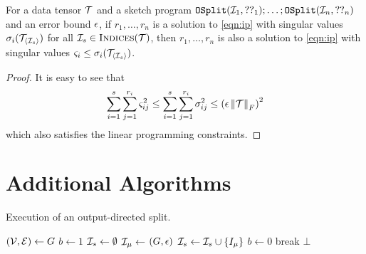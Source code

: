\begin{theorem}\label{thm:appendix:cost-bound}
For a data tensor $\mathcal{T}$ and a sketch program $\mathtt{OSplit}(\mathcal{I}_1, ??_1); \ldots; \mathtt{OSplit}(\mathcal{I}_n, ??_n)$ and an error bound $\epsilon$, if $r_1, \ldots, r_n$ is a solution to \cref{eqn:ip} with singular values $\sigma_i(\mathcal{T}_{\langle\mathcal{I}_s\rangle})$ for all $\mathcal{I}_s \in \textsc{Indices}(\mathcal{T})$, then $r_1, \ldots, r_n$ is also a solution to \cref{eqn:ip} with singular values $\varsigma_i \leq \sigma_i(\mathcal{T}_{\langle\mathcal{I}_s\rangle})$.
\end{theorem}
\begin{proof}
It is easy to see that
$$
\sum_{i=1}^{s}\sum_{j=1}^{r_i} \varsigma_{ij}^{2} \leq \sum_{i=1}^{s}\sum_{j=1}^{r_i} \sigma_{ij}^2 \leq \left(\epsilon\left\lVert\mathcal{T}\right\rVert_{F}\right)^2
$$
which also satisfies the linear programming constraints.
\end{proof}

\section{Additional Algorithms}\label{sec:appendix:alg}
\begin{algorithm}[h]
\small
\caption{Execution of an output-directed split.}\label{alg:out-split}
\begin{algorithmic}[1]
        \State $(\mathcal{V}, \mathcal{E}) \gets G$
            \State $b \gets 1$
            \State $\mathcal{I}_s \gets \emptyset$
                \State $\mathcal{I}_\mu \gets$ 
                \If{$\ind_\mu = \ind$}
                    \State \Return $(G, \epsilon)$
                \ElsIf{$\ind_\mu \subset \ind$}
                    \State $\mathcal{I}_s \gets \mathcal{I}_s \cup \{I_\mu\}$
                \ElsIf{$\ind_\mu \cap \ind \not= \emptyset$}
                    \State $b \gets 0$
                    \State break
                \EndIf
            \EndFor
                \State \Return {}
            \EndIf
        \EndFor
        \State \Return $\bot$
    \EndFunction
\end{algorithmic}    
\end{algorithm}

